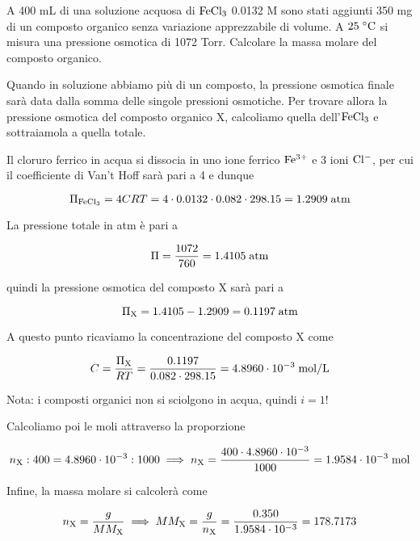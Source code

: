 \begin{esercizio}
    A 400 mL di una soluzione acquosa di $\rm FeCl_3$ 0.0132 M sono stati aggiunti 350 mg di un composto organico senza variazione apprezzabile di volume. A $25 \; ^{\circ} \rm C$ si misura una pressione osmotica di 1072 Torr. Calcolare la massa molare del composto organico.
\end{esercizio}
\begin{soluzione}
    Quando in soluzione abbiamo più di un composto, la pressione osmotica finale sarà data dalla somma delle singole pressioni osmotiche. Per trovare allora la pressione osmotica del composto organico X, calcoliamo quella dell'$\rm FeCl_3$ e sottraiamola a quella totale.

Il cloruro ferrico in acqua si dissocia in uno ione ferrico $\rm Fe^{3+}$ e 3 ioni $\rm Cl^-$, per cui il coefficiente di Van't Hoff sarà pari a 4 e dunque

$$\Pi_{\rm FeCl_3}=4CRT
=4 \cdot 0.0132 \cdot 0.082 \cdot 298.15
=1.2909 \; \rm atm$$

La pressione totale in atm è pari a

$$\Pi=\frac{1072}{760}=1.4105 \; \rm atm$$

quindi la pressione osmotica del composto X sarà pari a

$$\Pi_{\rm X}=1.4105 - 1.2909 = 0.1197 \; \rm atm$$

A questo punto ricaviamo la concentrazione del composto X come

$$C=\frac{\Pi_{\rm X}}{RT}=\frac{0.1197}{0.082 \cdot 298.15}
=4.8960 \cdot 10^{-3} \; \rm mol/L$$

Nota: i composti organici non si sciolgono in acqua, quindi $i=1$!

Calcoliamo poi le moli attraverso la proporzione

$$n_{\rm X}:400=4.8960 \cdot 10^{-3}:1000
\implies
n_{\rm X}=\frac{400 \cdot 4.8960 \cdot 10^{-3}}{1000}
=1.9584 \cdot 10^{-3} \; \rm mol$$

Infine, la massa molare si calcolerà come

$$n_{\rm X}=\frac{g}{MM_{\rm X}}
\implies
MM_{\rm X}=\frac{g}{n_{\rm X}}=\frac{0.350}{1.9584 \cdot 10^{-3}}=178.7173$$
\end{soluzione}

\newpage

